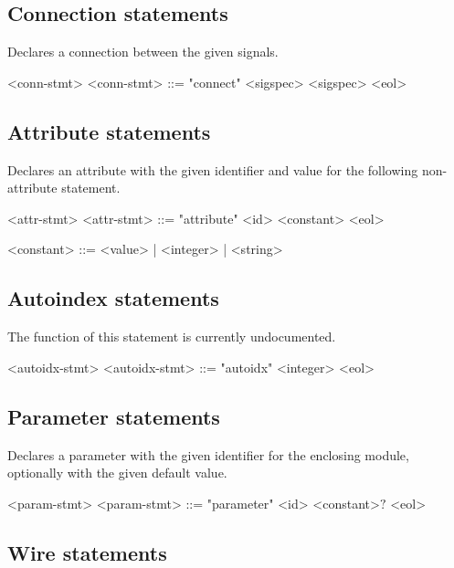 \subsection{Connection statements}

Declares a connection between the given signals.

\begin{indentgrammar}{<conn-stmt>}
<conn-stmt> ::= "connect" <sigspec> <sigspec> <eol>
\end{indentgrammar}

\subsection{Attribute statements}

Declares an attribute with the given identifier and value for the following non-attribute statement.

\begin{indentgrammar}{<attr-stmt>}
<attr-stmt> ::= "attribute" <id> <constant> <eol>

<constant> ::= <value> | <integer> | <string>
\end{indentgrammar}

\subsection{Autoindex statements}

The function of this statement is currently undocumented.

\begin{indentgrammar}{<autoidx-stmt>}
<autoidx-stmt> ::= "autoidx" <integer> <eol>
\end{indentgrammar}

\subsection{Parameter statements}

Declares a parameter with the given identifier for the enclosing module, optionally with the given default value.

\begin{indentgrammar}{<param-stmt>}
<param-stmt> ::= "parameter" <id> <constant>$?$ <eol>
\end{indentgrammar}

\subsection{Wire statements}


